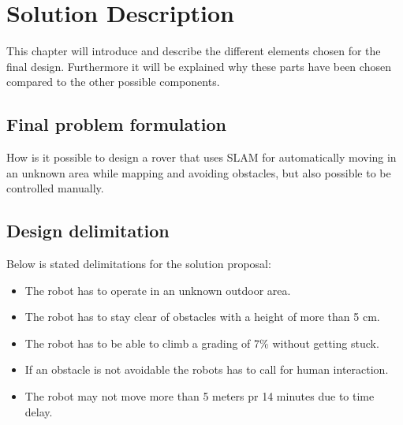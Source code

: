 \chapter{Solution Description}\label{ch:solutionDescription}

This chapter will introduce and describe the different elements chosen for the final design. Furthermore it will be explained why these parts have been chosen compared to the other possible components.

\section{Final problem formulation}\label{ch:finalproblem}

How is it possible to design a rover that uses SLAM for automatically moving in an unknown area while mapping and avoiding obstacles, but also possible to be controlled manually.



\section{Design delimitation}\label{ch:Designdelimitations}

Below is stated delimitations for the solution proposal:

\begin{itemize}
    \item The robot has to operate in an unknown outdoor area.
    \item The robot has to stay clear of obstacles with a height of more than 5 cm. 
    \item The robot has to be able to climb a grading of 7\% without getting stuck.
    \item If an obstacle is not avoidable the robots has to call for human interaction.
    \item The robot may not move more than 5 meters pr 14 minutes due to time delay.
\end{itemize}

